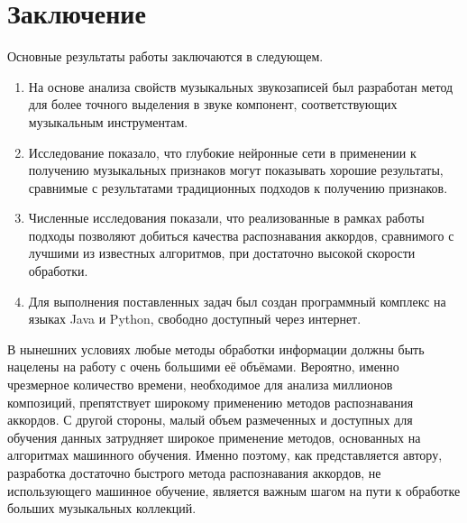 \chapter*{Заключение}						%
\label{chaptC}

Основные результаты работы заключаются в следующем.
\begin{enumerate}
  \item На основе анализа свойств музыкальных звукозаписей был разработан метод
  для более точного выделения в звуке компонент, соответствующих музыкальным
  инструментам.
  \item Исследование показало, что глубокие нейронные сети в применении к
  получению музыкальных признаков могут показывать хорошие результаты, сравнимые
  с результатами традиционных подходов к получению признаков.
  \item Численные исследования показали, что реализованные в рамках работы
  подходы позволяют добиться качества распознавания аккордов, сравнимого с
  лучшими из известных алгоритмов, при достаточно высокой скорости обработки.
  \item Для выполнения поставленных задач был создан программный комплекс на
  языках Java и Python, свободно доступный через интернет.
\end{enumerate}

В нынешних условиях любые методы обработки информации должны быть нацелены на
работу с очень большими её объёмами. Вероятно, именно чрезмерное количество
времени, необходимое для анализа миллионов композиций, препятствует широкому
применению методов распознавания аккордов. С другой стороны, малый объем
размеченных и доступных для обучения данных затрудняет широкое применение
методов, основанных на алгоритмах машинного обучения. Именно поэтому, как
представляется автору, разработка достаточно быстрого метода распознавания
аккордов, не использующего машинное обучение, является важным шагом на пути к
обработке больших музыкальных коллекций.

\clearpage